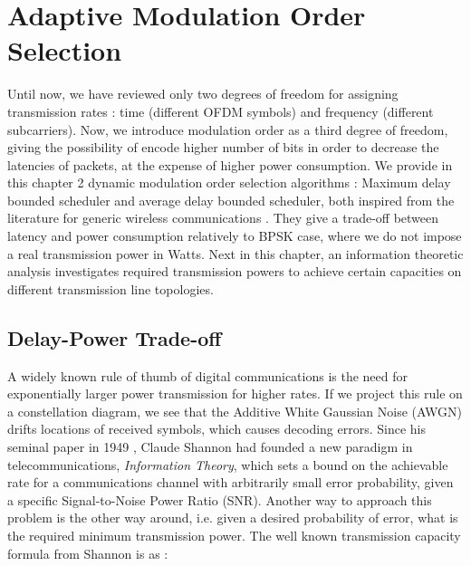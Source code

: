 
\chapter{Adaptive Modulation Order Selection} %

\label{Chapter7} %

Until now, we have reviewed only two degrees of freedom for assigning transmission rates : time (different OFDM symbols) and frequency (different subcarriers). Now, we introduce modulation order as a third degree of freedom, giving the possibility of encode higher number of bits in order to decrease the latencies of packets, at the expense of higher power consumption. We provide in this chapter 2 dynamic modulation order selection algorithms : Maximum delay bounded scheduler and average delay bounded scheduler, both inspired from the literature for generic wireless communications \cite{khojastepour2003power}\cite{rajan2004delay}. They give a trade-off between latency and power consumption relatively to BPSK case, where we do not impose a real transmission power in Watts. Next in this chapter, an information theoretic analysis investigates required transmission powers to achieve certain capacities on different transmission line topologies. 

\section{Delay-Power Trade-off}

A widely known rule of thumb of digital communications is the need for exponentially larger power transmission for higher rates. If we project this rule on a constellation diagram, we see that the Additive White Gaussian Noise (AWGN) drifts locations of received symbols, which causes decoding errors. Since his seminal paper in 1949 \cite{shannon1949mathematical}, Claude Shannon had founded a new paradigm in telecommunications, \textit{Information Theory}, which sets a bound on the achievable rate for a communications channel with arbitrarily small error probability, given a specific Signal-to-Noise Power Ratio (SNR). Another way to approach this problem is the other way around, i.e. given a desired probability of error, what is the required minimum transmission power. The well known transmission capacity formula from Shannon is as :

